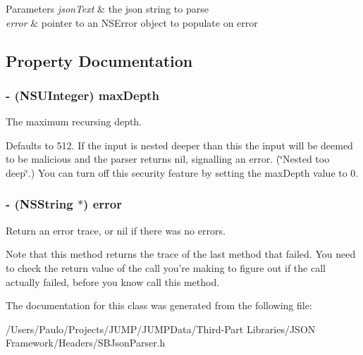 \begin{DoxyParams}{Parameters}
{\em jsonText} & the json string to parse \\
\hline
{\em error} & pointer to an NSError object to populate on error \\
\hline
\end{DoxyParams}


\subsection{Property Documentation}
\hypertarget{interface_s_b_json_parser_a0378b4ce99a1caeddc4a05da37ca4ffa}{
\subsubsection[{maxDepth}]{\setlength{\rightskip}{0pt plus 5cm}-\/ (NSUInteger) maxDepth}}
\label{interface_s_b_json_parser_a0378b4ce99a1caeddc4a05da37ca4ffa}


The maximum recursing depth. 

Defaults to 512. If the input is nested deeper than this the input will be deemed to be malicious and the parser returns nil, signalling an error. (\char`\"{}Nested too deep\char`\"{}.) You can turn off this security feature by setting the maxDepth value to 0. \hypertarget{interface_s_b_json_parser_ab9b74d7c752a03042edb78beeafaa6ce}{
\subsubsection[{error}]{\setlength{\rightskip}{0pt plus 5cm}-\/ (NSString $\ast$) error}}
\label{interface_s_b_json_parser_ab9b74d7c752a03042edb78beeafaa6ce}


Return an error trace, or nil if there was no errors. 

Note that this method returns the trace of the last method that failed. You need to check the return value of the call you're making to figure out if the call actually failed, before you know call this method. 

The documentation for this class was generated from the following file:\begin{DoxyCompactItemize}
\item 
/Users/Paulo/Projects/JUMP/JUMPData/Third-\/Part Libraries/JSON Framework/Headers/SBJsonParser.h\end{DoxyCompactItemize}
